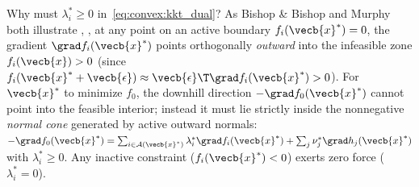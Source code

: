 \documentclass[../../../../master.tex]{subfiles}
\begin{document}
\begin{intuition}
Why must $\lambda_i^* \ge 0$ in~\eqref{eq:convex:kkt_dual}? As Bishop \& Bishop and Murphy both illustrate , , at any point on an active boundary $f_i(\vecb{x}^*) = 0$, the gradient $\grad f_i(\vecb{x}^*)$ points orthogonally \emph{outward} into the infeasible zone $f_i(\vecb{x}) > 0$ (since $f_i(\vecb{x}^* + \vecb{\epsilon}) \approx \vecb{\epsilon}\T\grad f_i(\vecb{x}^*) > 0$). For $\vecb{x}^*$ to minimize $f_0$, the downhill direction $-\grad f_0(\vecb{x}^*)$ cannot point into the feasible interior; instead it must lie strictly inside the nonnegative \emph{normal cone} generated by active outward normals: $-\grad f_0(\vecb{x}^*) = \sum_{i \in \mathcal{A}(\vecb{x}^*)} \lambda_i^* \grad f_i(\vecb{x}^*) + \sum_j \nu_j^* \grad h_j(\vecb{x}^*)$ with $\lambda_i^* \ge 0$. Any inactive constraint ($f_i(\vecb{x}^*) < 0$) exerts zero force ($\lambda_i^* = 0$).
\end{intuition}
\end{document}
